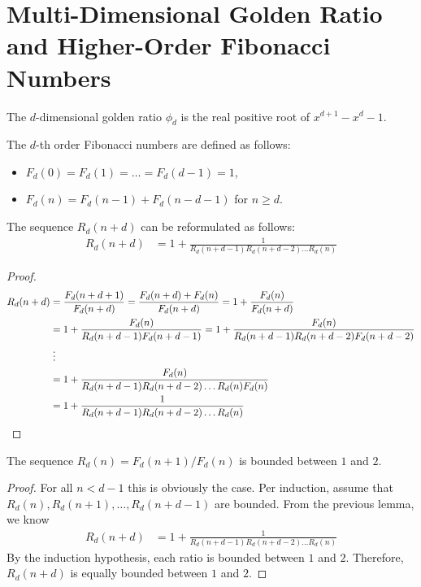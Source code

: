 \documentclass[english,version-2020-11]{uzl-thesis}
\begin{document}
\section{Multi-Dimensional Golden Ratio and Higher-Order Fibonacci Numbers}

\begin{definition}
  The $d$-dimensional golden ratio $\phi_d$ is the real positive root of $x^{d+1} - x^d - 1$.
\end{definition}

\begin{definition}
  The $d$-th order Fibonacci numbers are defined as follows:
  \begin{itemize}
    \item $F_d(0) = F_d(1) = \dots = F_d(d-1) = 1$,
    \item $F_d(n) = F_d(n-1) + F_d(n-d-1)$ for $n \ge d$.
  \end{itemize}
\end{definition}

\begin{lemma}
  The sequence $R_d(n+d)$ can be reformulated as follows:
  \begin{align*}
    R_d(n+d)
    & = 1 + \frac{1}{R_d(n+d-1) R_d(n+d-2) \dots R_d(n)}
  \end{align*}
\end{lemma}

\begin{proof}
  \begin{align*}
    R_d(n+d)
    & = \frac{F_d(n+d+1)}{F_d(n+d)}
    = \frac{F_d(n+d) + F_d(n)}{F_d(n+d)}
    = 1 + \frac{F_d(n)}{F_d(n+d)} \\
    & = 1 + \frac{F_d(n)}{R_d(n+d-1) F_d(n+d-1)}
    = 1 + \frac{F_d(n)}{R_d(n+d-1) R_d(n+d-2) F_d(n+d-2)} \\
    & \mathrel{\vdots} \\
    & = 1 + \frac{F_d(n)}{R_d(n+d-1) R_d(n+d-2) \dots R_d(n) F_d(n)} \\
    & = 1 + \frac{1}{R_d(n+d-1) R_d(n+d-2) \dots R_d(n)}
    \qedhere
  \end{align*}
\end{proof}

\begin{lemma}
  The sequence $R_d(n) = F_d(n+1) / F_d(n)$ is bounded between $1$ and $2$.
\end{lemma}

\begin{proof}
  For all $n < d - 1$ this is obviously the case.
  Per induction, assume that $R_d(n), R_d(n+1), \dots, R_d(n+d-1)$ are bounded.
  From the previous lemma, we know
  \begin{align*}
    R_d(n+d)
    & = 1 + \frac{1}{R_d(n+d-1) R_d(n+d-2) \dots R_d(n)}
  \end{align*}
  By the induction hypothesis, each ratio is bounded between $1$ and $2$.
  Therefore, $R_d(n+d)$ is equally bounded between $1$ and $2$.
\end{proof}
\end{document}
